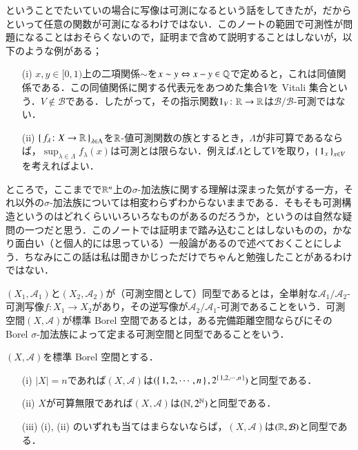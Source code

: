 \begin{que}[*]
ということでたいていの場合に写像は可測になるという話をしてきたが，だからといって任意の関数が可測になるわけではない．このノートの範囲で可測性が問題になることはおそらくないので，証明まで含めて説明することはしないが，以下のような例がある；
\begin{enumerate}
\item[(i)] $x,y \in [0,1)$上の二項関係$\sim$を$x \sim y \Leftrightarrow x-y \in \mathbb{Q}$で定めると，これは同値関係である．この同値関係に関する代表元をあつめた集合$V$を Vitali 集合という．$V \notin \mathcal{B}$である．したがって，その指示関数$1_V \colon \mathbb{R} \to \mathbb{R}$は$\mathcal{B}/\mathcal{B}$-可測ではない．
\item[(ii)] $\set{f_\lambda \colon X \to \mathbb{R}}_{\lambda \in \Lambda}$を$\mathbb{R}$-値可測関数の族とするとき，$\Lambda$が非可算であるならば，$\sup_{\lambda \in \Lambda} f_\lambda (x)$は可測とは限らない．例えば$\Lambda$として$V$を取り，$\set{1_x}_{x \in V}$を考えればよい．
\end{enumerate}
\end{que}

ところで，ここまでで$\mathbb{R}^n$上の$\sigma$-加法族に関する理解は深まった気がする一方，それ以外の$\sigma$-加法族については相変わらずわからないままである．そもそも可測構造というのはどれくらいいろいろなものがあるのだろうか，というのは自然な疑問の一つだと思う．このノートでは証明まで踏み込むことはしないものの，かなり面白い（と個人的には思っている）一般論があるので述べておくことにしよう．ちなみにこの話は私は聞きかじっただけでちゃんと勉強したことがあるわけではない．

\begin{defi}
$(X_1,\mathcal{A}_1)$と$(X_2, \mathcal{A}_2)$が（可測空間として）同型であるとは，全単射な$\mathcal{A}_1/\mathcal{A}_2$-可測写像$f \colon X_1 \to X_2$があり，その逆写像が$\mathcal{A}_2/\mathcal{A}_1$-可測であることをいう．可測空間$(X,\mathcal{A})$が標準 Borel 空間であるとは，ある完備距離空間ならびにその Borel $\sigma$-加法族によって定まる可測空間と同型であることをいう．
\end{defi}

\begin{que}[Kuratowski,**]
$(X,\mathcal{A})$を標準 Borel 空間とする．
\begin{itemize}
\item[(i)] $|X| = n$であれば$(X,\mathcal{A})$は$(\set{1, 2, \cdots, n}, 2^{\set{1, 2, \cdots, n}})$と同型である．
\item[(ii)] $X$が可算無限であれば$(X,\mathcal{A})$は$(\mathbb{N}, 2^{\mathbb{N}})$と同型である．
\item[(iii)] (i), (ii) のいずれも当てはまらないならば，$(X,\mathcal{A})$は$(\mathbb{R}, \mathcal{B})$と同型である．
\end{itemize}
\end{que}

